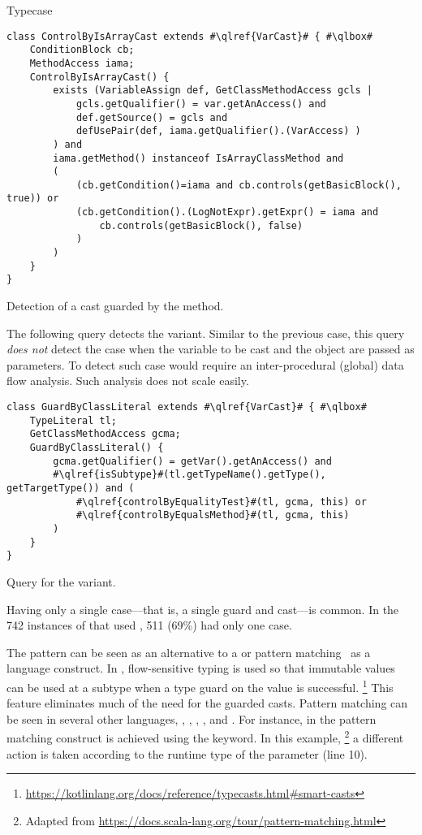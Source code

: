\begin{pattern}{Typecase}
\begin{listing}
\begin{verbatim}
class ControlByIsArrayCast extends #\qlref{VarCast}# { #\qlbox#
	ConditionBlock cb;
	MethodAccess iama;
	ControlByIsArrayCast() {
		exists (VariableAssign def, GetClassMethodAccess gcls |
			gcls.getQualifier() = var.getAnAccess() and
			def.getSource() = gcls and
			defUsePair(def, iama.getQualifier().(VarAccess) )
		) and
		iama.getMethod() instanceof IsArrayClassMethod and
		(
			(cb.getCondition()=iama and cb.controls(getBasicBlock(), true)) or
			(cb.getCondition().(LogNotExpr).getExpr() = iama and
				cb.controls(getBasicBlock(), false)
			)
		)
	}
}
\end{verbatim}
\caption{Detection of a cast guarded by the  method.}
\label{lst:casts:detect:isarraytypetag}
\end{listing}

The following query detects the  variant.
Similar to the previous case,
this query \emph{does not} detect the case when the variable to be cast and the  object are passed as parameters.
To detect such case would require an inter-procedural (global) data flow analysis.
Such analysis does not scale easily.

\begin{listing}
\begin{verbatim}
class GuardByClassLiteral extends #\qlref{VarCast}# { #\qlbox#
	TypeLiteral tl;
	GetClassMethodAccess gcma;
	GuardByClassLiteral() {
		gcma.getQualifier() = getVar().getAnAccess() and
		#\qlref{isSubtype}#(tl.getTypeName().getType(), getTargetType()) and (
			#\qlref{controlByEqualityTest}#(tl, gcma, this) or
			#\qlref{controlByEqualsMethod}#(tl, gcma, this)
		)
	}
}
\end{verbatim}
\caption{Query for the  variant.}
\end{listing}


\issues{}
Having only a single case---that is, a single guard and cast---is common.
In the 742 instances of \thisp{} that used , 511
(69\%) had only one case.

The \thisp{} pattern can be seen as an \adhoc{} alternative to a
 or pattern matching~\citep{milnerProposalStandardML1984} as a
language construct.
In \kotlin{}, flow-sensitive typing is used so that immutable values can be
used at a subtype when a type guard on the value is successful.%
\footnote{\url{https://kotlinlang.org/docs/reference/typecasts.html\#smart-casts}}
This feature eliminates much of the need for the guarded casts.
Pattern matching can be seen in several other languages, \eg, \ml{}, \scala{}, \csharp{}, and \haskell{}.
For instance, in \scala{} the pattern matching construct is achieved using the  keyword.
In this example,%
\footnote{Adapted from \url{https://docs.scala-lang.org/tour/pattern-matching.html}}
a different action is taken according to the runtime type of the parameter  (line 10).


\end{pattern}
